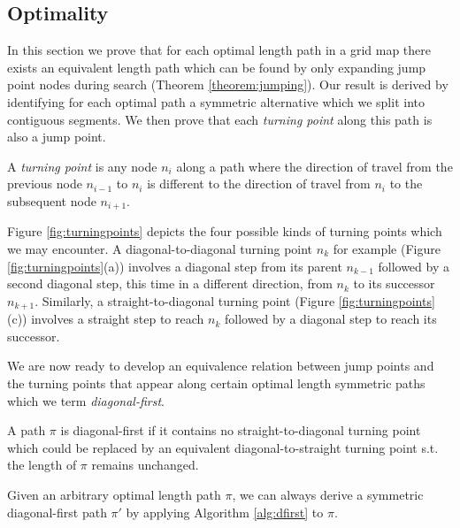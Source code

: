 \subsection{Optimality}
In this section we prove that for each optimal length path in a grid map there
exists an equivalent length path which can be found by only expanding jump
point nodes during search (Theorem \ref{theorem:jumping}).  Our result is
derived by identifying for each optimal path a symmetric alternative which we
split into contiguous segments. We then prove that each \emph{turning point}
along this path is also a jump point.

\begin{definition}
\label{def:turningpoint}
A \emph{turning point} is any node $n_{i}$ along a path where the direction of
travel from the previous node $n_{i-1}$ to $n_{i}$ is different to the direction
of travel from $n_{i}$ to the subsequent node $n_{i+1}$.
\end{definition}

Figure \ref{fig:turningpoints} depicts the four possible
kinds of turning points which we may encounter. 
A diagonal-to-diagonal turning point $n_{k}$ for example (Figure
\ref{fig:turningpoints}(a)) involves a diagonal step from its parent $n_{k-1}$ 
followed by a second diagonal step, this time in a different direction,
from $n_{k}$ to its successor $n_{k+1}$.
Similarly, a straight-to-diagonal turning point (Figure
\ref{fig:turningpoints}(c)) 
involves a straight step to reach $n_{k}$ followed by a diagonal step to reach its 
successor. 

We are now ready to develop an equivalence relation between
jump points and the turning points that appear along certain optimal length 
symmetric paths which we term \emph{diagonal-first}.
 
\begin{definition}
A path $\pi$ is diagonal-first if it contains no straight-to-diagonal turning point
which could be replaced by an equivalent diagonal-to-straight turning point s.t.
the length of $\pi$ remains unchanged.
\end{definition}

Given an arbitrary optimal length path $\pi$, we can always derive a symmetric
diagonal-first path $\pi'$ by applying Algorithm \ref{alg:dfirst} to $\pi$.



